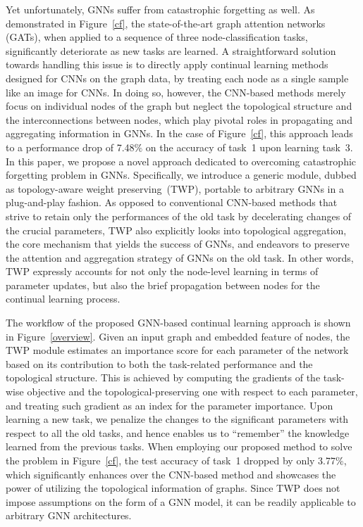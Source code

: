 \documentclass[letterpaper]{article} %
\begin{document}
Yet unfortunately, GNNs suffer from catastrophic forgetting as well.
As demonstrated in Figure~\ref{cf}, 
the state-of-the-art graph attention networks (GATs),
when applied to a sequence of three node-classification tasks,
significantly deteriorate 
as new tasks are learned.
A straightforward solution towards handling this issue 
is to directly apply  continual learning methods designed for CNNs 
on the graph data, by 
{treating each node as a single sample like an image for CNNs.}
In doing so, however, the CNN-based methods merely focus
on individual nodes of the graph but neglect the topological structure
and the interconnections between nodes,
which play pivotal roles in  propagating and aggregating information
in GNNs. In the case of Figure~\ref{cf}, 
this approach leads to a performance drop
of 7.48$\%$ on the accuracy of task~1
upon learning task~3. 
In this paper, we propose a novel approach 
dedicated to overcoming 
catastrophic forgetting problem in GNNs. 
Specifically, we introduce a generic module,
dubbed as topology-aware weight preserving~(TWP),
portable to arbitrary GNNs in a plug-and-play fashion. 
As opposed to conventional CNN-based methods that 
strive to retain only the performances of the old
task by decelerating changes of the crucial parameters,
TWP also explicitly looks into topological aggregation,
the core mechanism that yields the success of GNNs,
and endeavors to preserve the attention
and aggregation strategy of GNNs on the old task.
In other words, TWP expressly accounts for
not only the node-level learning 
in terms of parameter updates,
but also the brief propagation between nodes
for the continual learning process.

The workflow of the proposed GNN-based
continual learning approach is shown in Figure~\ref{overview}. 
Given an input graph and embedded feature of nodes, 
the TWP module estimates an importance score for each 
parameter of the network based on its contribution 
to both the task-related performance and the topological structure.
This is achieved by computing the 
gradients of the task-wise objective and 
the topological-preserving one
with respect to each parameter,
and treating such gradient as
an index for the parameter importance.
Upon learning a new task, we penalize
the changes to the significant parameters 
with respect to all the old tasks,
and hence enables us to ``remember'' the knowledge 
learned from the previous tasks.
{When employing our proposed method to
solve the problem in
Figure~\ref{cf}, the test accuracy of task~1 dropped by
only 3.77$\%$, which significantly enhances over the CNN-based method and 
showcases the power of utilizing the
topological information of graphs.}
Since TWP does not impose assumptions on the 
form of a GNN model,
it can be readily applicable to arbitrary GNN
architectures. 
\end{document}
